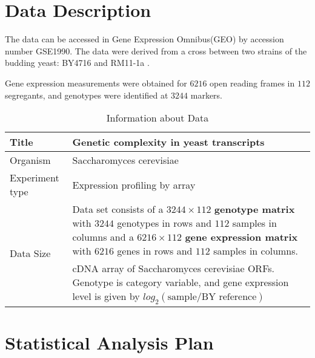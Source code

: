 

\section{Data Description}

The data can be accessed in Gene Expression Omnibus(GEO) by accession number GSE1990. 
The data were derived from a cross between two strains of the budding yeast: BY4716 and RM11-1a \citep{brem2005landscape}. 

Gene expression measurements were obtained for $6216$ open reading frames in $112$ segregants, and genotypes were identified at $3244$ markers. 

\begin{table}[h]
    \centering
    \begin{tabular}{|l|p{9cm}|}
        \hline
        Title                           &   Genetic complexity in yeast transcripts \\ \hline
        Organism                        &   Saccharomyces cerevisiae                \\ \hline
        Experiment type                 &   Expression profiling by array           \\ \hline
        \multirow{4}{*}{Data Size}      &   Data set consists of a $3244\times112$ \textbf{genotype matrix} with $3244$ genotypes in rows and $112$ samples in columns and a $6216\times112$ \textbf{gene expression matrix} with $6216$ genes in rows and $112$ samples in columns.  \\ \hline
        \multirow{3}{*}{Description}    &   cDNA array of Saccharomyces cerevisiae ORFs. Genotype is category variable, and gene expression level is given by  $log_2(\text{sample} / \text{BY reference})$\\ 
        \hline
    \end{tabular}
    \caption{Information about Data}
\end{table}


\section{Statistical Analysis Plan}

